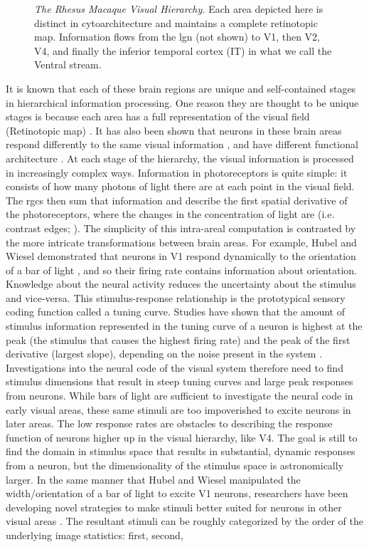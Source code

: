 \begin{figure}[h]
	\caption{\textit{The Rhesus Macaque Visual Hierarchy.} Each area depicted here is distinct in cytoarchitecture and maintains a complete retinotopic map. Information flows from the \gls{lgn} (not shown) to V1, then V2, V4, and finally the inferior temporal cortex (IT) in what we call the Ventral stream. }
	\label{fig:brain}
\end{figure}

It is known that each of these brain regions are unique and self-contained stages in hierarchical information processing. One reason they are thought to be unique stages is because each area has a full representation of the visual field (Retinotopic map) \citep{Felleman1997}. It has also been shown that neurons in these brain areas respond differently to the same visual information \citep{Mahon2001}, and have different functional architecture \citep{Yoshioka1996, Hubel1965}. At each stage of the hierarchy, the visual information is processed in increasingly complex ways. Information in photoreceptors is quite simple: it consists of how many photons of light there are at each point in the visual field. The \gls{rgcs} then sum that information and describe the first spatial derivative of the photoreceptors, where the changes in the concentration of light are (i.e. contrast edges; \cite{Wiesel1959}). The simplicity of this intra-areal computation is contrasted by the more intricate transformations between brain areas. For example, Hubel and Wiesel demonstrated that neurons in V1 respond dynamically to the orientation of a bar of light \citep{Hubel1959}, and so their firing rate contains information about orientation. Knowledge about the neural activity reduces the uncertainty about the stimulus and vice-versa. This stimulus-response relationship is the prototypical sensory coding function called a tuning curve. Studies have shown that the amount of stimulus information represented in the tuning curve of a neuron is highest at the peak (the stimulus that causes the highest firing rate) and the peak of the first derivative (largest slope), depending on the noise present in the system \parencite{Butts2006}. Investigations into the neural code of the visual system therefore need to find stimulus dimensions that result in steep tuning curves and large peak responses from neurons. While bars of light are sufficient to investigate the neural code in early visual areas, these same stimuli are too impoverished to excite neurons in later areas. The low response rates are obstacles to describing the response function of neurons higher up in the visual hierarchy, like V4. The goal is still to find the domain in stimulus space that results in substantial, dynamic responses from a neuron, but the dimensionality of the stimulus space is astronomically larger. In the same manner that Hubel and Wiesel manipulated the width/orientation of a bar of light to excite V1 neurons, researchers have been developing novel strategies to make stimuli better suited for neurons in other visual areas \parencite{Hubel1959, Pasupathy2002, Ponce2019, Cowley2017}. The resultant stimuli can be roughly categorized by the order of the underlying image statistics: first, second, 